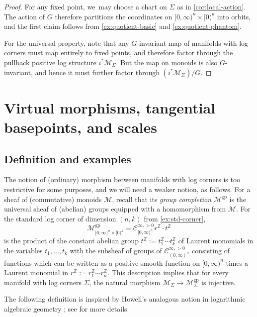 \documentclass[JEP,XML,SOM,Unicode,NoFloatCountersInSection,published]{cedram}
\theoremstyle{definition}
\theoremstyle{remark}
\let\defn\emph
\newcommand{\ZZ}{\mathbb{Z}}
\newcommand{\model}[2]{\halfspc{#1}\times[0)^{#2}}
\newcommand{\halfspc}[1]{[0,\infty)^{#1}}
\newcommand{\cM}{\mathscr{M}}
\newcommand{\cMgp}{\mathscr{M}^{\mathrm{gp}}}
\newcommand{\Cinfpos}[1]{\mathscr{C}^{\infty, > 0}_{#1}}
\newcommand{\Sig}{\Sigma}
\begin{document}
\begin{proof}
For any fixed point, we~may choose a chart on $\Sig$ as in \autoref{cor:local-action}. The action of $G$ therefore partitions the coordinates on $\model{n}{k}$ into orbits, and the first claim follows from \autoref{ex:quotient-basic} and \autoref{ex:quotient-phantom}.

For the universal property, note that any $G$\nobreakdash-invariant map of manifolds with log corners must map entirely to fixed points, and therefore factor through the pullback positive log structure $i^*\cM_\Sig$. But the map on monoids is also $G$\nobreakdash-invariant, and hence it must further factor through $(i^*\cM_\Sig)/G$.
\end{proof}

\section{Virtual morphisms, tangential basepoints, and scales}\label{sec:weak-morphisms}

\subsection{Definition and examples}

The notion of (ordinary) morphism between manifolds with log corners is too restrictive for some purposes, and we will need a weaker notion, as follows. For a sheaf of (commutative) monoids $\cM$, recall that its \defn{group completion} $\cMgp$ is the universal sheaf of (abelian) groups equipped with a homomorphism from $\cM$. For the standard log corner of dimension $(n,k)$ from \autoref{ex:std-corner},
\[
\cMgp_{\model{n}{k}} = \Cinfpos{\halfspc{n}}r^{\ZZ}\cdot t^{\ZZ}
\]
is the product of the constant abelian group $t^{\ZZ}:=t_1^{\ZZ}\cdots t_k^{\ZZ}$ of Laurent monomials in the variables $t_1,\ldots,t_k$ with the subsheaf of groups of $\Cinfpos{(0,\infty)^n}$ consisting of functions which can be written as a positive smooth function on $\halfspc{n}$ times a Laurent monomial in $r^{\ZZ}:=r_1^{\ZZ}\cdots r_n^{\ZZ}$. This description implies that for every manifold with log corners $\Sig$, the natural morphism $\cM_\Sig\to \cMgp_\Sig$ is injective.

The following definition is inspired by Howell's analogous notion in logarithmic algebraic geometry \cite{Howell2017}; see \cite{DPP:WeakMorphisms} for more details.
\end{document}
